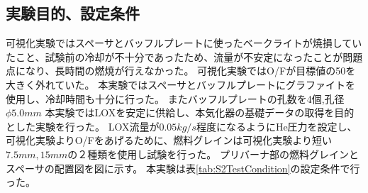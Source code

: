 \subsection{実験目的、設定条件}
可視化実験ではスペーサとバッフルプレートに使ったベークライトが焼損していたこと、試験前の冷却が不十分であったため、流量が不安定になったことが問題点になり、長時間の燃焼が行えなかった。
可視化実験ではO/Fが目標値の50を大きく外れていた。
本実験ではスペーサとバッフルプレートにグラファイトを使用し、冷却時間も十分に行った。
またバッフルプレートの孔数を4個,孔径$\phi5.0mm$
本実験ではLOXを安定に供給し、本気化器の基礎データの取得を目的とした実験を行った。
LOX流量が$0.05kg/s$程度になるようにHe圧力を設定し、可視化実験よりO/Fをあげるために、燃料グレインは可視化実験より短い$7.5mm,15mm$の２種類を使用し試験を行った。
プリバーナ部の燃料グレインとスペーサの配置図を図に示す。
本実験は表\ref{tab:S2TestCondition}の設定条件で行った。
